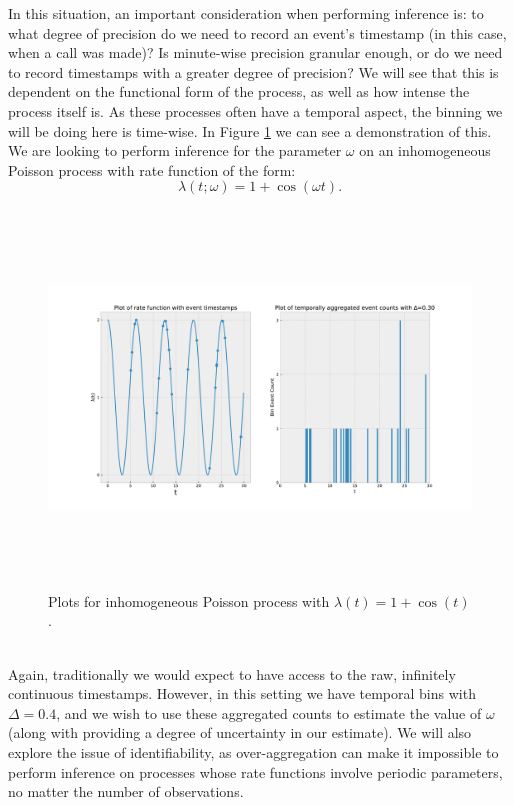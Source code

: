 \documentclass[11pt,a4,twosided,singlespacing,titlepagenumber=on,numbers=endperiod]{scrreprt}
\numberwithin{equation}{chapter} %
\theoremstyle{remark}
\begin{document}
In this situation, an important consideration when performing inference is: to what degree of precision do we need to record an event's timestamp (in this case, when a call was made)? Is minute-wise precision granular enough, or do we need to record timestamps with a greater degree of precision? We will see that this is dependent on the functional form of the process, as well as how intense the process itself is. As these processes often have a temporal aspect, the binning we will be doing here is time-wise.
In Figure \ref{fig:nhpp_periodic} we can see a demonstration of this. We are looking to perform inference for the parameter $\omega$ on an inhomogeneous Poisson process with  rate function of the form:
\begin{equation*}
	\lambda(t; \omega) = 1 + \cos(\omega t).
\end{equation*}
\begin{figure}[!h]
	\includegraphics[height=10cm, width=15cm]{nhpp_periodic.pdf}
	\centering
	\caption{Plots for inhomogeneous Poisson process with $\lambda(t)= 1 + \cos(t)$.}
	\label{fig:nhpp_periodic}
\end{figure}\\\noindent
Again, traditionally we would expect to have access to the raw, infinitely continuous timestamps. However, in this setting we have temporal bins with $\Delta=0.4$, and we wish to use these aggregated counts to estimate the value of $\omega$ (along with providing a degree of uncertainty in our estimate). We will also explore the issue of identifiability, as over-aggregation can make it impossible to perform inference on processes whose rate functions involve periodic parameters, no matter the number of observations.
\end{document}
